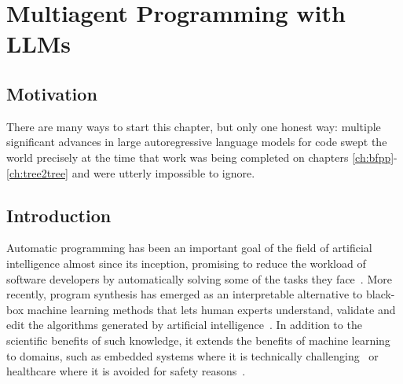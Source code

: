 \chapter{Multiagent Programming with LLMs}\label{ch:seidr}

\newcommand{\method}[0]{SEIDR}
\newcommand{\synthesize}[0]{SYNTHESIZE}
\newcommand{\execute}[0]{EXECUTE}
\newcommand{\instruct}[0]{INSTRUCT}
\newcommand{\instructs}[0]{INSTRUCT$^{\text{static}}$}
\newcommand{\instructllm}[0]{INSTRUCT$^{\text{LLM}}$}
\newcommand{\debug}[0]{DEBUG}
\newcommand{\rank}[0]{RANK}
\newcommand{\beamwidth}[0]{W}
\newcommand{\treearity}[0]{N}
\newcommand{\treearitydebug}[0]{N_\text{debug}}
\newcommand{\treearityexplain}[0]{N_\text{explain}}
\newcommand{\treearitydraft}[0]{N_\text{synth}}
\newcommand{\expectedoutput}[0]{O}
\newcommand{\synthmodel}[0]{$p_\text{synth}(\text{code}, \text{descr})$}
\newcommand{\debugmodel}[0]{$p_\text{debug}(\text{code}, \text{descr})$}
\newcommand{\textmodel}[0]{$p_\text{explain}(\text{code}, \text{descr})$}
\newcommand{\synthmodelnoargs}[0]{$p_\text{synth}$}
\newcommand{\debugmodelnoargs}[0]{$p_\text{debug}$}
\newcommand{\textmodelnoargs}[0]{$p_\text{explain}$}

\newcommand{\gpt}[0]{GPT-3.5}
\newcommand{\llama}[0]{Llama~3}
\newcommand{\cpp}[0]{C++}
\newcommand{\py}[0]{Python}
\newcommand{\smalltt}[1]{\texttt{\fontsize{8.5}{9}\selectfont#1}}


\section{Motivation}
There are many ways to start this chapter, but only one honest way: multiple significant advances in large autoregressive language models for code swept the world precisely at the time that work was being completed on chapters \ref{ch:bfpp}-\ref{ch:tree2tree} and were utterly impossible to ignore.


\section{Introduction}
\label{sec:seidr-intro}

Automatic programming has been an important goal of the field of artificial intelligence almost since its inception, promising to reduce the workload of software developers by automatically solving some of the tasks they face~\cite{manna1971:automatic}.
More recently, program synthesis has emerged as an interpretable alternative to black-box machine learning methods that lets human experts understand, validate and edit the algorithms generated by artificial intelligence~\cite{bastani2022:interpretable}.
In addition to the scientific benefits of such knowledge, it extends the benefits of machine learning to domains, such as embedded systems where it is technically challenging~\cite{dhar2021:survey} or healthcare where it is avoided for safety reasons~\cite{connolly2023:systematic,jia2022:role}.

